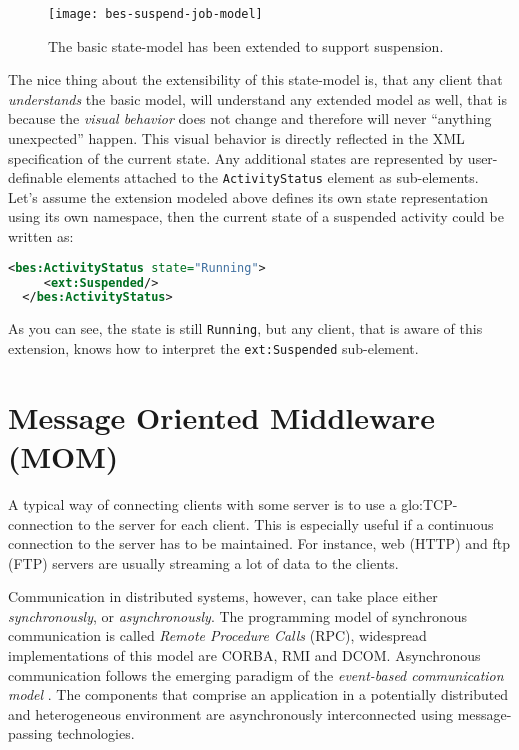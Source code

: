 \begin{figure}[h]
  \centering
  \texttt{[image: bes-suspend-job-model]}
  \caption[Extended  BES Job-State-Model]{The  basic state-model  has been
    extended to support suspension.}
  \label{fig:bes-suspend-model}
\end{figure}

The nice  thing about the extensibility  of this state-model  is, that any
client  that  \emph{understands}  the  basic model,  will  understand  any
extended model  as well, that  is because the \emph{visual  behavior} does
not change  and therefore will never ``anything  unexpected'' happen. This
visual  behavior is  directly reflected  in the  XML specification  of the
current state.   Any additional  states are represented  by user-definable
elements attached to  the \texttt{ActivityStatus} element as sub-elements.
Let's  assume   the  extension  modeled   above  defines  its   own  state
representation  using its  own  namespace,  then the  current  state of  a
suspended activity could be written as:

\begin{lstlisting}[language=XML]
  <bes:ActivityStatus state="Running">
     <ext:Suspended/>
  </bes:ActivityStatus>
\end{lstlisting}

As you can see, the state  is still \texttt{Running}, but any client, that
is   aware    of   this   extension,   knows   how    to   interpret   the
\texttt{ext:Suspended} sub-element.

\section[Message Oriented Middleware]{Message Oriented Middleware (MOM)}
\label{sec:fundamentals:mom}

A  typical  way  of connecting  clients  with  some  server  is to  use  a
\gls{glo:TCP}-connection to the server for each client. This is especially
useful if a continuous connection to  the server has to be maintained. For
instance, web (\ie HTTP) and ftp (\ie FTP) servers are usually streaming
a lot of data to the clients.

Communication  in  distributed systems,  however,  can  take place  either
\emph{synchronously}, or  \emph{asynchronously}. The programming  model of
synchronous communication  is called \emph{Remote  Procedure Calls} (RPC),
widespread  implementations  of  this  model  are  CORBA,  RMI  and  DCOM.
Asynchronous   communication  follows   the  emerging   paradigm   of  the
\emph{event-based  communication  model}  \cite{MeCa:2005:Taxonomy}.   The
components that  comprise an application in a  potentially distributed and
heterogeneous   environment   are   asynchronously  interconnected   using
message-passing technologies.

